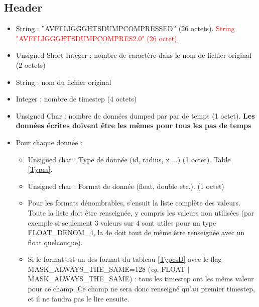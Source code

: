 \documentclass[a4paper,12pt]{article}
\begin{document}
{{{\subsection{Header}
\begin{itemize}
 \item String : ''AVFFLIGGGHTSDUMPCOMPRESSED'' (26 octets). \textcolor{red}{String "AVFFLIGGGHTSDUMPCOMPRES2.0" (26 octet)}.
 \item Unsigned Short Integer : nombre de caract\`ere dans le nom de fichier original (2 octets)
 \item String : nom du fichier original
 \item Integer : nombre de timestep (4 octets)
 \item Unsigned Char : nombre de donn\'ees dumped par par de temps (1 octet). \textbf{Les donn\'ees \'ecrites doivent \^etre les m\^emes pour tous les pas de temps}
 \item Pour chaque donn\'ee :
   \begin{itemize}
     \item Unsigned char : Type de donn\'ee (id, radius, x ...) (1 octet). Table \ref{Types}.
     \item Unsigned char : Format de donn\'ee (float, double etc.). (1 octet)
     \item Pour les formats d\'enombrables, s'ensuit la liste compl\`ete des valeurs. Toute la liste doit \^etre renseign\'ee, y compris les valeurs non utilis\'ees (par exemple si seulement 3 valeurs sur 4 sont utiles pour un type FLOAT\_DENOM\_4, la 4e doit tout de m\^eme \^etre renseign\'ee avec un float quelconque).
     \item \color{red} Si le format est un des format du tableau \ref{TypesD} avec le flag MASK\_ALWAYS\_THE\_SAME=128 (\textit{eg.} FLOAT $|$ MASK\_ALWAYS\_THE\_SAME) : tous les timestep ont les m\^ems valeur pour ce champ. Ce champ ne sera donc renseign\'e qu'au premier timestep, et il ne faudra pas le lire ensuite.
   \end{itemize}
\end{itemize}


}}}
\end{document}
